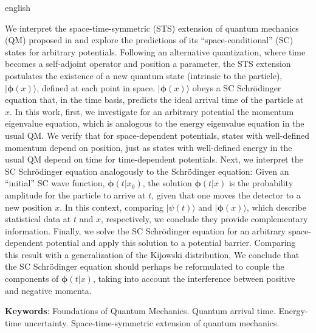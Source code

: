 \begin{resumo}[Abstract]
\begin{otherlanguage*}{english}

We interpret the space-time-symmetric (STS) extension of quantum mechanics (QM) proposed in \cite{Dias} and explore the predictions of its ``space-conditional'' (SC) states for arbitrary potentials. Following an alternative quantization, where time becomes a self-adjoint operator and position a parameter, the STS extension postulates the existence of a new quantum state (intrinsic to the particle), $|\pmb{\phi}(x)\rangle$, defined at each point in space. $|\pmb{\phi}(x)\rangle$ obeys a SC Schr\"odinger equation that, in the time basis, predicts the ideal arrival time of the particle at $x$. In this work, first, we investigate for an arbitrary potential the momentum eigenvalue equation, which is analogous to the energy eigenvalue equation in the usual QM. We verify that for space-dependent potentials, states with well-defined momentum depend on position, just as states with well-defined energy in the usual QM depend on time for time-dependent potentials. Next, we interpret the SC Schr\"odinger equation analogously to the Schr\"odinger equation: Given an ``initial'' SC wave function, $\pmb{\phi}(t|x_0)$, the solution $\pmb{\phi}(t|x)$ is the probability amplitude for the particle to arrive at $t$, given that one moves the detector to a new position $x$. In this context, comparing $|\psi(t)\rangle$ and $|\pmb{\phi}(x)\rangle$, which describe statistical data at $t$ and $x$, respectively, we conclude they provide complementary information. Finally, we solve the SC Schr\"odinger equation for an arbitrary space-dependent potential and apply this solution to a potential barrier. Comparing this result with a generalization of the Kijowski distribution, We conclude that the SC Schr\"odinger equation should perhaps be reformulated to couple the components of $\pmb{\phi}(t|x)$, taking into account the interference between positive and negative momenta.



   \vspace{\onelineskip} 
 
   \noindent 
   \textbf{Keywords}: Foundations of Quantum Mechanics. Quantum arrival time. Energy-time uncertainty. Space-time-symmetric extension of quantum mechanics.
 \end{otherlanguage*}
 \end{resumo}
